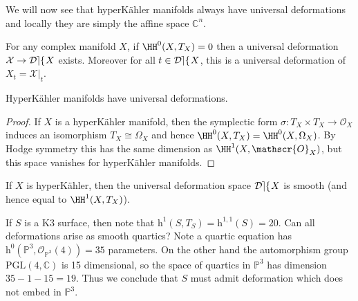 We will now see that hyperK\"ahler manifolds always have universal deformations
and locally they are simply the affine space \(\mathbb{C}^n\).

\begin{theorem}
    For any complex manifold \(X\), if \(\HH^0(X,T_X)=0\) then a universal
    deformation \(\mathcal{X}\to \mathop{\mathcal{D\kern -0.5pt e\kern -0.5pt f\kern -1pt}} X\) exists. Moreover for all \(t\in \mathop{\mathcal{D\kern -0.5pt e\kern -0.5pt f\kern -1pt}}
    X\), this is a universal deformation of \(X_t=\mathcal{X}|_t\).
\end{theorem}

\begin{corollary}
    HyperK\"ahler manifolds have universal deformations.
    \begin{proof}
        If \(X\) is a hyperK\"ahler manifold, then the symplectic form
        \(\sigma:T_X\times T_X\to \mathscr{O}_X\) induces an isomorphism
        \(T_X\cong \Omega_X\) and hence \(\HH^0(X,T_X)=\HH^0(X,\Omega_X)\).
        By Hodge symmetry this has the same dimension as
        \(\HH^1(X,\mathscr{O}_X)\), but this space vanishes for hyperK\"ahler
        manifolds.
    \end{proof}
\end{corollary}

\begin{theorem}
    If \(X\) is hyperK\"ahler, then the universal deformation space \(\mathop{\mathcal{D\kern -0.5pt e\kern -0.5pt f\kern -1pt}} X\)
    is smooth (and hence equal to \(\HH^1(X,T_X)\)).
\end{theorem}

\begin{example}
    If \(S\) is a K3 surface, then note that
    \(\text{h}^1(S,T_S)=\text{h}^{1,1}(S)=20\). Can all deformations arise as
    smooth quartics? Note a quartic equation has
    \(\text{h}^0(\mathbb{P}^3, \mathscr{O}_{\mathbb{P}^3}(4))=35\)
    parameters. On the other hand the automorphism group
    \(\text{PGL}(4,\mathbb{C})\) is 15 dimensional, so the space of
    quartics in \(\mathbb{P}^3\) has dimension \(35-1-15=19\). Thus we conclude
    that \(S\) must admit deformation which does not embed in
    \(\mathbb{P}^3\).
\end{example}

